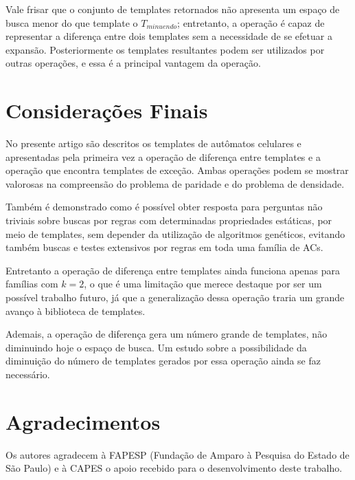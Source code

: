 \documentclass[12pt, a4paper]{article}
\begin{document}
Vale frisar que o conjunto de templates retornados não apresenta um espaço de busca menor do que template o $T_{minuendo}$; entretanto, a operação é capaz de representar a diferença entre dois templates sem a necessidade de se efetuar a expansão. Posteriormente os templates resultantes podem ser utilizados por outras operações, e essa é a principal vantagem da operação. 









\section{Considerações Finais}
\label{sec:consideracoes_finais}
No presente artigo são descritos os templates de autômatos celulares e apresentadas pela primeira vez a operação de diferença entre templates e a operação que encontra templates de exceção. Ambas operações podem se mostrar valorosas na compreensão do problema de paridade e do problema de densidade.

Também é demonstrado como é possível obter resposta para perguntas não triviais sobre buscas por regras com determinadas propriedades estáticas, por meio de templates, sem depender da utilização de algoritmos genéticos, evitando também buscas e testes extensivos por regras em toda uma família de ACs.

Entretanto a operação de diferença entre templates ainda funciona apenas para famílias com $k=2$, o que é uma limitação que merece destaque por ser um possível trabalho futuro, já que a generalização dessa operação traria um grande avanço à biblioteca de templates. 

Ademais, a operação de diferença gera um número grande de templates, não diminuindo hoje o espaço de busca. Um estudo sobre a possibilidade da diminuição do número de templates gerados por essa operação ainda se faz necessário.

\section*{Agradecimentos}
\label{sec:agrdecimentos}
Os autores agradecem à FAPESP (Fundação de Amparo à Pesquisa do Estado de São Paulo) e à CAPES o apoio recebido para o desenvolvimento deste trabalho.

\def\refname{REFERÊNCIAS BIBLIOGRÁFICAS}


\end{document}

